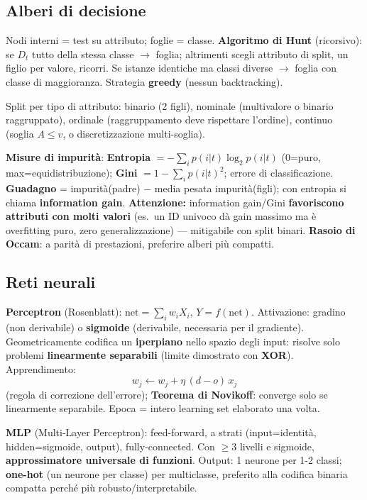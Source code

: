 \documentclass[10pt,a4paper]{article}
\newcommand{\attn}[1]{\textbf{Attenzione:} #1}
\begin{document}
\subsection{Alberi di decisione}

Nodi interni = test su attributo; foglie = classe. \textbf{Algoritmo di Hunt} (ricorsivo): se $D_t$ tutto della stessa classe $\to$ foglia; altrimenti scegli attributo di split, un figlio per valore, ricorri. Se istanze identiche ma classi diverse $\to$ foglia con classe di maggioranza. Strategia \textbf{greedy} (nessun backtracking).

Split per tipo di attributo: binario (2 figli), nominale (multivalore o binario raggruppato), ordinale (raggruppamento deve rispettare l'ordine), continuo (soglia $A\le v$, o discretizzazione multi-soglia).

\textbf{Misure di impurità}: \textbf{Entropia} $= -\sum_i p(i|t)\log_2 p(i|t)$ (0=puro, max=equidistribuzione); \textbf{Gini} $=1-\sum_i p(i|t)^2$; errore di classificazione. \textbf{Guadagno} = impurità(padre) $-$ media pesata impurità(figli); con entropia si chiama \textbf{information gain}. \attn{information gain/Gini \textbf{favoriscono attributi con molti valori} (es.\ un ID univoco dà gain massimo ma è overfitting puro, zero generalizzazione) --- mitigabile con split binari.} \textbf{Rasoio di Occam}: a parità di prestazioni, preferire alberi più compatti.

\subsection{Reti neurali}

\textbf{Perceptron} (Rosenblatt): $\text{net}=\sum_i w_i X_i$, $Y=f(\text{net})$. Attivazione: gradino (non derivabile) o \textbf{sigmoide} (derivabile, necessaria per il gradiente). Geometricamente codifica un \textbf{iperpiano} nello spazio degli input: risolve solo problemi \textbf{linearmente separabili} (limite dimostrato con \textbf{XOR}). Apprendimento:
\[
w_j \leftarrow w_j + \eta\,(d-o)\,x_j
\]
(regola di correzione dell'errore); \textbf{Teorema di Novikoff}: converge solo se linearmente separabile. Epoca = intero learning set elaborato una volta.

\textbf{MLP} (Multi-Layer Perceptron): feed-forward, a strati (input=identità, hidden=sigmoide, output), fully-connected. Con $\ge 3$ livelli e sigmoide, \textbf{approssimatore universale di funzioni}. Output: 1 neurone per 1-2 classi; \textbf{one-hot} (un neurone per classe) per multiclasse, preferito alla codifica binaria compatta perché più robusto/interpretabile.
\end{document}
